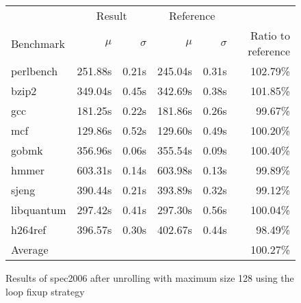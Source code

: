 \begin{figure}[h]
    \begin{center}
        \begin{tabular}{lrrrrr}
            \toprule
            & \multicolumn{2}{c}{Result} & \multicolumn{2}{c}{Reference}\\
            Benchmark & $\mu$ & $\sigma$ & $\mu$ & $\sigma$ & Ratio to reference\\
            \midrule
            perlbench & 251.88s & 0.21s & 245.04s & 0.31s & 102.79\%\\
            bzip2 & 349.04s & 0.45s & 342.69s & 0.38s & 101.85\%\\
            gcc & 181.25s & 0.22s & 181.86s & 0.26s & 99.67\%\\
            mcf & 129.86s & 0.52s & 129.60s & 0.49s & 100.20\%\\
            gobmk & 356.96s & 0.06s & 355.54s & 0.09s & 100.40\%\\
            hmmer & 603.31s & 0.14s & 603.98s & 0.13s & 99.89\%\\
            sjeng & 390.44s & 0.21s & 393.89s & 0.32s & 99.12\%\\
            libquantum & 297.42s & 0.41s & 297.30s & 0.56s & 100.04\%\\
            h264ref & 396.57s & 0.30s & 402.67s & 0.44s & 98.49\%\\
            \midrule
            Average & & & & & 100.27\%\\
            \bottomrule
        \end{tabular}
    \end{center}
    \caption{Results of spec2006 after unrolling with maximum size 128 using the loop fixup strategy}
    \label{fig:eval:perf:loop:128}
\end{figure}
